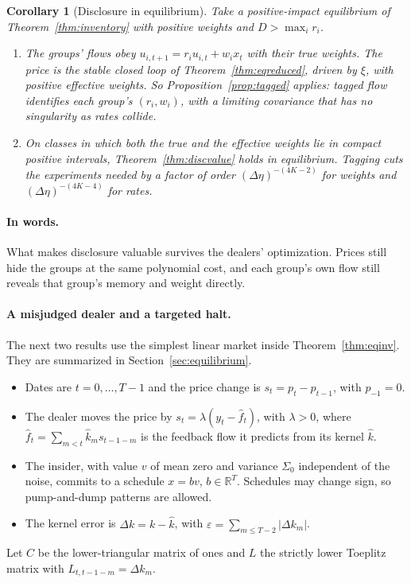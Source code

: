 \documentclass[12pt]{article}
\newtheorem{corollary}[theorem]{Corollary}
\theoremstyle{definition}
\theoremstyle{remark}
\newcommand{\R}{\mathbb{R}}
\begin{document}
\begin{corollary}[Disclosure in equilibrium]\label{cor:eqdisclosure}
Take a positive-impact equilibrium of Theorem~\ref{thm:inventory} with positive weights and $D>\max_ir_i$.
\begin{enumerate}[label=(\roman*),itemsep=1pt]
\item The groups' flows obey $u_{i,t+1}=r_iu_{i,t}+w_ix_t$ with their \emph{true} weights. The price is the stable closed loop of Theorem~\ref{thm:eqreduced}, driven by $\xi$, with positive effective weights. So Proposition~\ref{prop:tagged} applies: tagged flow identifies each group's $(r_i,w_i)$, with a limiting covariance that has no singularity as rates collide.
\item On classes in which both the true and the effective weights lie in compact positive intervals, Theorem~\ref{thm:discvalue} holds in equilibrium. Tagging cuts the experiments needed by a factor of order $(\Delta\eta)^{-(4K-2)}$ for weights and $(\Delta\eta)^{-(4K-4)}$ for rates.
\end{enumerate}
\end{corollary}

\paragraph{In words.} What makes disclosure valuable survives the dealers' optimization. Prices still hide the groups at the same polynomial cost, and each group's own flow still reveals that group's memory and weight directly.
\paragraph{A misjudged dealer and a targeted halt.} The next two results use the simplest linear market inside Theorem~\ref{thm:eqinv}. They are summarized in Section~\ref{sec:equilibrium}.
\begin{itemize}[itemsep=1pt,topsep=2pt]
\item Dates are $t=0,\ldots,T-1$ and the price change is $s_t=p_t-p_{t-1}$, with $p_{-1}=0$.
\item The dealer moves the price by $s_t=\lambda(y_t-\hat f_t)$, with $\lambda>0$, where $\hat f_t=\sum_{m<t}\hat k_ms_{t-1-m}$ is the feedback flow it predicts from its kernel $\hat k$.
\item The insider, with value $v$ of mean zero and variance $\Sigma_0$ independent of the noise, commits to a schedule $x=bv$, $b\in\R^T$. Schedules may change sign, so pump-and-dump patterns are allowed.
\item The kernel error is $\Delta k=k-\hat k$, with $\varepsilon=\sum_{m\le T-2}|\Delta k_m|$.
\end{itemize}
Let $C$ be the lower-triangular matrix of ones and $L$ the strictly lower Toeplitz matrix with $L_{t,t-1-m}=\Delta k_m$.
\end{document}
